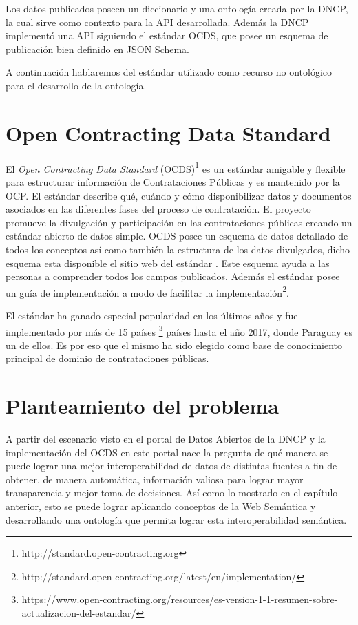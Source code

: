 Los datos publicados poseen un diccionario y una ontología creada por la DNCP, la cual sirve como contexto para la API desarrollada. Además la DNCP implementó una API siguiendo el estándar OCDS, que posee un esquema de publicación bien definido en JSON Schema.

A continuación hablaremos del estándar utilizado como recurso no ontológico para el desarrollo de la ontología.

\section{Open Contracting Data Standard}
\label{section:OCDS}

El \textit{Open Contracting Data Standard} (OCDS)\footnote{http://standard.open-contracting.org}  es un estándar amigable y flexible para estructurar información de Contrataciones Públicas y es mantenido por la OCP. El estándar describe qué, cuándo y cómo disponibilizar datos y documentos asociados en las diferentes fases del proceso de contratación. El proyecto promueve la divulgación y participación en las contrataciones públicas creando un estándar abierto de datos simple. OCDS posee un esquema de datos detallado de todos los conceptos así como también la estructura de los datos divulgados, dicho esquema esta disponible el sitio web del estándar \cite{OCDSReleaseSchema:online}. Este esquema ayuda a las personas a comprender todos los campos publicados. Además el estándar posee un guía de implementación a modo de facilitar la implementación\footnote{http://standard.open-contracting.org/latest/en/implementation/}.

El estándar ha ganado especial popularidad en los últimos años y fue implementado por más de 15 países \footnote{https://www.open-contracting.org/resources/es-version-1-1-resumen-sobre-actualizacion-del-estandar/} países hasta el año 2017, donde Paraguay es un de ellos. Es por eso que el mismo ha sido elegido como base de conocimiento principal de dominio de contrataciones públicas.

\section{Planteamiento del problema}
\label{section:planteamientoDelProblema}

A partir del escenario visto en el portal de Datos Abiertos de la DNCP y la implementación del OCDS en este portal nace la pregunta de qué manera se puede lograr una mejor interoperabilidad de datos de distintas fuentes a fin de obtener, de manera automática, información valiosa para lograr mayor transparencia y mejor toma de decisiones. Así como lo mostrado en el capítulo anterior, esto se puede lograr aplicando conceptos de la Web Semántica y desarrollando una ontología que permita lograr esta interoperabilidad semántica. 

